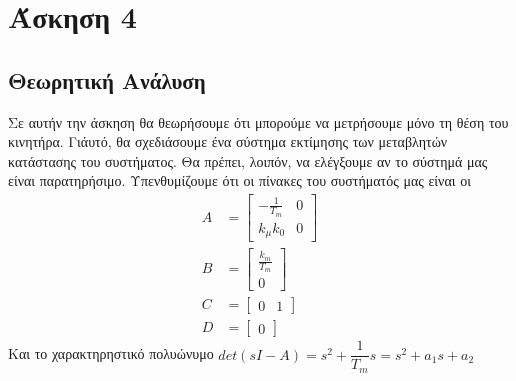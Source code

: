\section{Άσκηση 4}
\subsection{Θεωρητική Ανάλυση}
Σε αυτήν την άσκηση θα θεωρήσουμε ότι μπορούμε να μετρήσουμε μόνο τη θέση του κινητήρα. Γιάυτό, θα σχεδιάσουμε ένα
σύστημα εκτίμησης των μεταβλητών κατάστασης του συστήματος. Θα πρέπει, λοιπόν, να ελέγξουμε αν το σύστημά μας είναι παρατηρήσιμο. Υπενθυμίζουμε ότι οι πίνακες του συστήματός μας είναι οι
\begin{align*}
	A &= \begin{bmatrix} -\frac{1}{T_m} & 0 \\ k_μk_0 & 0\end{bmatrix} \\
	B &= \begin{bmatrix} \frac{k_m}{T_m} \\ 0 \end{bmatrix} \\
	C &= \begin{bmatrix} 0 & 1\end{bmatrix} \\
	D &= \begin{bmatrix} 0 \end{bmatrix}
\end{align*}
Και το χαρακτηρηστικό πολυώνυμο $det(sI - A) = s^2 + \dfrac{1}{T_m}s = s^2 + a_1s+a_2$

